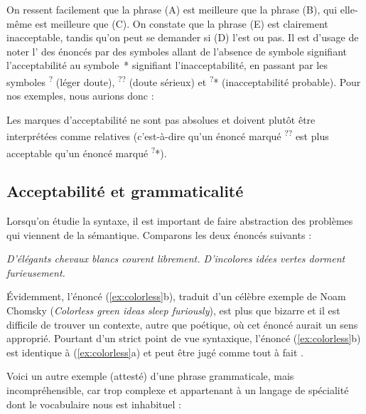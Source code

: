 On ressent facilement que la phrase (A) est meilleure que la phrase (B), qui elle-même est meilleure que (C). On constate que la phrase (E) est clairement inacceptable, tandis qu’on peut se demander si (D) l’est ou pas. Il est d’usage de noter l’ des énoncés par des symboles allant de l’absence de symbole signifiant l’acceptabilité au symbole~* signifiant l’inacceptabilité, en passant par les symboles \textsuperscript{?} (léger doute), \textsuperscript{??} (doute sérieux) et \textsuperscript{?}* (inacceptabilité probable). Pour nos exemples, nous aurions donc :

\ea
{}
\z
\z

Les marques d’acceptabilité ne sont pas absolues et doivent plutôt être interprétées comme relatives (c’est-à-dire qu’un énoncé marqué \textsuperscript{??} est plus acceptable qu’un énoncé marqué \textsuperscript{?}*).

\subsection{Acceptabilité et grammaticalité}

Lorsqu’on étudie la syntaxe, il est important de faire abstraction des problèmes qui viennent de la sémantique. Comparons les deux énoncés suivants :

\ea\label{ex:colorless}
\ea\itshape D’élégants chevaux blancs courent librement.
\ex\itshape D’incolores idées vertes dorment furieusement.
\z
\z

Évidemment, l’énoncé (\ref{ex:colorless}b), traduit d’un célèbre exemple de Noam Chomsky (\textit{Colorless green ideas sleep furiously}), est plus que bizarre et il est difficile de trouver un contexte, autre que poétique, où cet énoncé aurait un sens approprié. Pourtant d’un strict point de vue syntaxique, l’énoncé (\ref{ex:colorless}b) est identique à (\ref{ex:colorless}a) et peut être jugé comme tout à fait .

Voici un autre exemple (attesté) d’une phrase grammaticale, mais incompréhensible, car trop complexe et appartenant à un langage de spécialité dont le vocabulaire nous est inhabituel :

